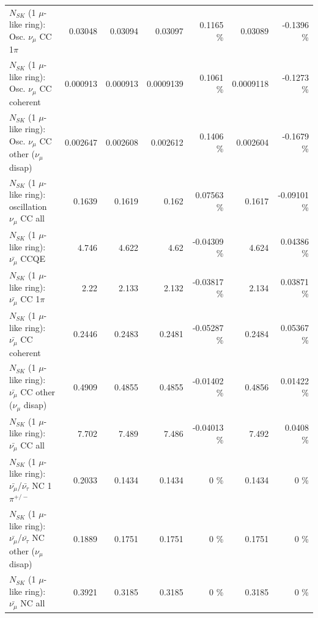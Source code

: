 \begin{table}
\begin{tabular}{| l | r | r | r  r | r  r |}
                          $N_{SK}$ (1 $\mu$-like ring): Osc. $\nu_\mu$ CC 1$\pi$ &         0.03048 &         0.03094 &         0.03097 &   0.1165 \%  &         0.03089 &  -0.1396 \%  \\ 
                        $N_{SK}$ (1 $\mu$-like ring): Osc. $\nu_\mu$ CC coherent &        0.000913 &        0.000913 &       0.0009139 &   0.1061 \%  &       0.0009118 &  -0.1273 \%  \\ 
         $N_{SK}$ (1 $\mu$-like ring): Osc. $\nu_\mu$ CC other ($\nu_\mu$ disap) &        0.002647 &        0.002608 &        0.002612 &   0.1406 \%  &        0.002604 &  -0.1679 \%  \\ 
                      $N_{SK}$ (1 $\mu$-like ring): oscillation $\nu_\mu$ CC all &          0.1639 &          0.1619 &           0.162 &  0.07563 \%  &          0.1617 & -0.09101 \%  \\ 
\hline
\hline
                              $N_{SK}$ (1 $\mu$-like ring): $\bar{\nu_\mu}$ CCQE &           4.746 &           4.622 &            4.62 & -0.04309 \%  &           4.624 &  0.04386 \%  \\ 
                         $N_{SK}$ (1 $\mu$-like ring): $\bar{\nu_\mu}$ CC 1$\pi$ &            2.22 &           2.133 &           2.132 & -0.03817 \%  &           2.134 &  0.03871 \%  \\ 
                       $N_{SK}$ (1 $\mu$-like ring): $\bar{\nu_\mu}$ CC coherent &          0.2446 &          0.2483 &          0.2481 & -0.05287 \%  &          0.2484 &  0.05367 \%  \\ 
        $N_{SK}$ (1 $\mu$-like ring): $\bar{\nu_\mu}$ CC other ($\nu_\mu$ disap) &          0.4909 &          0.4855 &          0.4855 & -0.01402 \%  &          0.4856 &  0.01422 \%  \\ 
                          $N_{SK}$ (1 $\mu$-like ring): $\bar{\nu_{\mu}}$ CC all &           7.702 &           7.489 &           7.486 & -0.04013 \%  &           7.492 &   0.0408 \%  \\ 
\hline
  $N_{SK}$ (1 $\mu$-like ring): $\bar{\nu_\mu}$/$\bar{\nu_\tau}$ NC 1$\pi^{+/-}$ &          0.2033 &          0.1434 &          0.1434 &        0 \%  &          0.1434 &        0 \%  \\ 
$N_{SK}$ (1 $\mu$-like ring): $\bar{\nu_\mu}$/$\bar{\nu_\tau}$ NC other ($\nu_\mu$ disap) &          0.1889 &          0.1751 &          0.1751 &        0 \%  &          0.1751 &        0 \%  \\ 
                          $N_{SK}$ (1 $\mu$-like ring): $\bar{\nu_{\mu}}$ NC all &          0.3921 &          0.3185 &          0.3185 &        0 \%  &          0.3185 &        0 \%  \\ 

\end{tabular}
\end{table}
